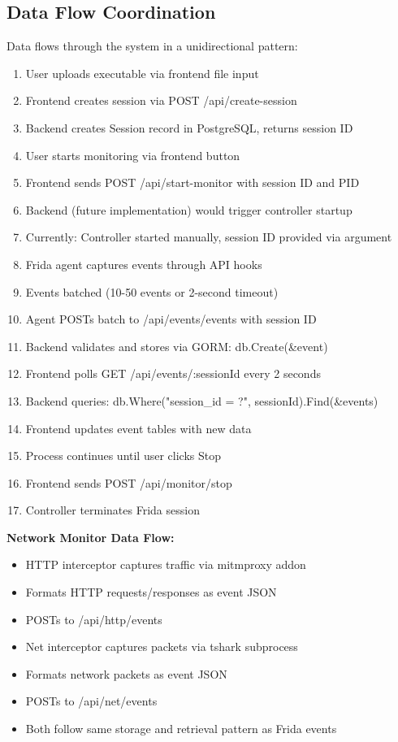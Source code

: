 \subsection{Data Flow Coordination}

Data flows through the system in a unidirectional pattern:

\begin{enumerate}
    \item User uploads executable via frontend file input
    \item Frontend creates session via POST /api/create-session
    \item Backend creates Session record in PostgreSQL, returns session ID
    \item User starts monitoring via frontend button
    \item Frontend sends POST /api/start-monitor with session ID and PID
    \item Backend (future implementation) would trigger controller startup
    \item Currently: Controller started manually, session ID provided via argument
    \item Frida agent captures events through API hooks
    \item Events batched (10-50 events or 2-second timeout)
    \item Agent POSTs batch to /api/events/events with session ID
    \item Backend validates and stores via GORM: db.Create(\&event)
    \item Frontend polls GET /api/events/:sessionId every 2 seconds
    \item Backend queries: db.Where("session\_id = ?", sessionId).Find(\&events)
    \item Frontend updates event tables with new data
    \item Process continues until user clicks Stop
    \item Frontend sends POST /api/monitor/stop
    \item Controller terminates Frida session
\end{enumerate}

\textbf{Network Monitor Data Flow:}
\begin{itemize}
    \item HTTP interceptor captures traffic via mitmproxy addon
    \item Formats HTTP requests/responses as event JSON
    \item POSTs to /api/http/events
    \item Net interceptor captures packets via tshark subprocess
    \item Formats network packets as event JSON
    \item POSTs to /api/net/events
    \item Both follow same storage and retrieval pattern as Frida events
\end{itemize}

